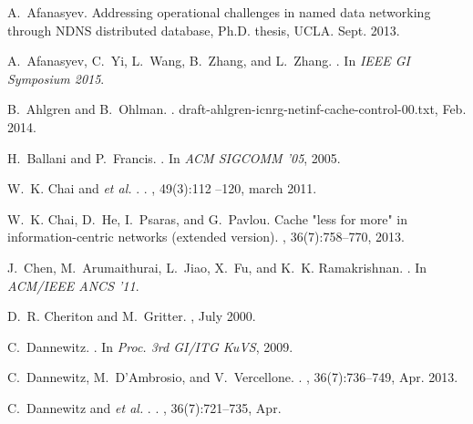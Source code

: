 \documentclass{sig-alternate}
\newcommand{\etal}{{\em et al. \/}}
\begin{document}

\begin{thebibliography}{10}

A.~Afanasyev.
\newblock Addressing operational challenges in named data networking through
  {NDNS} distributed database, {Ph.D.} thesis, {UCLA}.
\newblock Sept. 2013.

A.~Afanasyev, C.~Yi, L.~Wang, B.~Zhang, and L.~Zhang.
.
\newblock In {\em IEEE GI Symposium 2015}.

B.~Ahlgren and B.~Ohlman.
.
  draft-ahlgren-icnrg-netinf-cache-control-00.txt, Feb. 2014.

H.~Ballani and P.~Francis.
.
\newblock In {\em ACM SIGCOMM '05}, 2005.

W.~K. Chai and \etal.
.
, 49(3):112 --120, march 2011.

W.~K. Chai, D.~He, I.~Psaras, and G.~Pavlou.
\newblock Cache "less for more" in information-centric networks (extended
  version).
, 36(7):758--770, 2013.

J.~Chen, M.~Arumaithurai, L.~Jiao, X.~Fu, and K.~K. Ramakrishnan.
.
\newblock In {\em ACM/IEEE ANCS '11}.

D.~R. Cheriton and M.~Gritter.
, July 2000.

C.~Dannewitz.
.
\newblock In {\em Proc. 3rd GI/ITG KuVS}, 2009.

C.~Dannewitz, M.~D'Ambrosio, and V.~Vercellone.
.
, 36(7):736--749, Apr. 2013.

C.~Dannewitz and \etal.
.
, 36(7):721--735, Apr.


\end{thebibliography}
\end{document}
